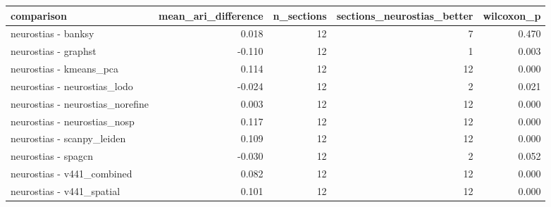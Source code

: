 \begin{tabular}{lrrrr}
\toprule
comparison & mean_ari_difference & n_sections & sections_neurostias_better & wilcoxon_p \\
\midrule
neurostias - banksy & 0.018 & 12 & 7 & 0.470 \\
neurostias - graphst & -0.110 & 12 & 1 & 0.003 \\
neurostias - kmeans_pca & 0.114 & 12 & 12 & 0.000 \\
neurostias - neurostias_lodo & -0.024 & 12 & 2 & 0.021 \\
neurostias - neurostias_norefine & 0.003 & 12 & 12 & 0.000 \\
neurostias - neurostias_nosp & 0.117 & 12 & 12 & 0.000 \\
neurostias - scanpy_leiden & 0.109 & 12 & 12 & 0.000 \\
neurostias - spagcn & -0.030 & 12 & 2 & 0.052 \\
neurostias - v441_combined & 0.082 & 12 & 12 & 0.000 \\
neurostias - v441_spatial & 0.101 & 12 & 12 & 0.000 \\
\bottomrule
\end{tabular}
